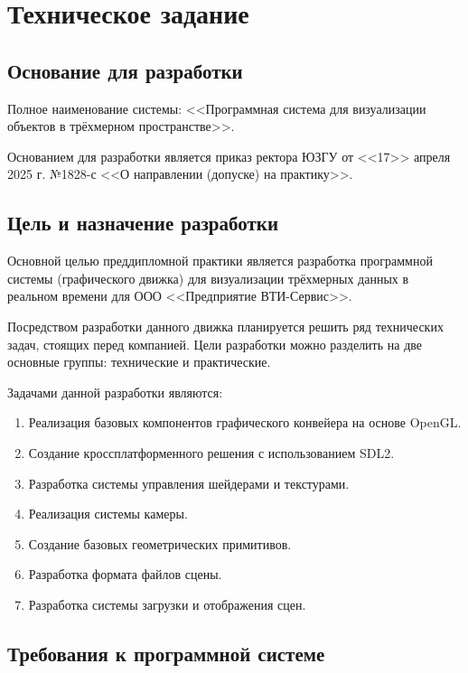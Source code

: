 \section{Техническое задание}
\subsection{Основание для разработки}

Полное наименование системы: <<Программная система для визуализации объектов в трёхмерном пространстве>>.

Основанием для разработки является приказ ректора ЮЗГУ от <<17>> апреля 2025 г. №1828-с <<О направлении (допуске) на практику>>.

\subsection{Цель и назначение разработки}

Основной целью преддипломной практики является разработка программной системы (графического движка) для визуализации трёхмерных данных в реальном времени для ООО <<Предприятие ВТИ-Сервис>>.

Посредством разработки данного движка планируется решить ряд технических задач, стоящих перед компанией. Цели разработки можно разделить на две основные группы: технические и практические.

Задачами данной разработки являются:

\begin{enumerate}
    \item Реализация базовых компонентов графического конвейера на основе OpenGL.
    \item Создание кроссплатформенного решения с использованием SDL2.
    \item Разработка системы управления шейдерами и текстурами.
    \item Реализация системы камеры.
    \item Создание базовых геометрических примитивов.
    \item Разработка формата файлов сцены.
    \item Разработка системы загрузки и отображения сцен.
\end{enumerate}

\subsection{Требования к программной системе}

